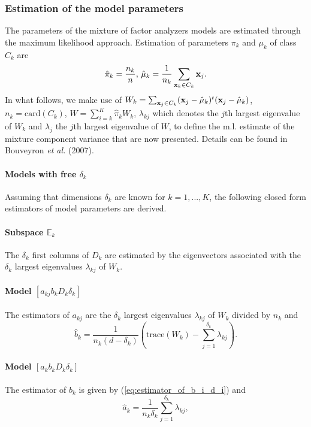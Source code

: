 \documentclass[12pt]{article}
\newcommand{\tr}{\mbox{trace}}
\begin{document}
\subsubsection{Estimation of the model parameters}
The parameters of the mixture of factor analyzers models are estimated through the maximum
likelihood approach.  Estimation of parameters $\pi_{k}$ and $\mu_{k}$ of class $C_{k}$ are
\[\hat{\pi}_{k}=\frac{n_{k}}{n},\,\hat{\mu}_{k}=\frac{1}{n_{k}}\sum_{{\bf x}_{k}\in C_{k}}{\bf x}_{j}.\]
In what follows, we make use of $W_k=\sum_{{\bf x}_{j}\in C_{k}}({\bf
  x}_{j}-\hat{\mu}_{k})^{t}({\bf x}_{j}-\hat{\mu}_{k})$, $n_{k}=\mbox{card}(C_{k})$,
$W=\sum_{i=k}^{K}\hat{\pi}_{k}W _{k}$, $\lambda_{kj}$ which denotes the $j$th largest
eigenvalue of $W_{k}$ and $\lambda_{j}$ the $j$th largest eigenvalue of $W$, to define the
m.l. estimate of the mixture component variance that are now presented.  Details can be found
in Bouveyron {\it et al.} (2007).

\paragraph{Models with free $\delta_k$}
Assuming that dimensions $\delta_{k}$ are known for $k=1,...,K$, the following closed form
estimators of model parameters are derived.

\paragraph{Subspace $\mathbb{E}_{k}$} The $\delta_{k}$ first columns
of $D_{k}$ are estimated by the eigenvectors associated with the
$\delta_{k}$ largest eigenvalues $\lambda_{kj}$ of $W_{k}$.

\paragraph{Model $[a_{kj}b_{k}D_{k}\delta_{k}]$}
The estimators of $a_{kj}$ are the $\delta_{k}$ largest eigenvalues $\lambda_{kj}$ of $W_{k}$
divided by $n_k$ and
\begin{equation}
  \hat{b}_{k}=\frac{1}{n_k(d-\delta_{k})}\left(\tr(W_{k})-\sum_{j=1}^{\delta_{k}}\lambda_{kj}\right).
  \label{eq:estimator_of_b_i_d_i}
\end{equation}

\paragraph{Model $[a_{k}b_{k}D_{k}\delta_{k}]$}
The estimator of $b_{k}$ is given by (\ref{eq:estimator_of_b_i_d_i}) and
\begin{equation}
  \hat{a}_{k}=\frac{1}{n_k\delta_{k}}\sum_{j=1}^{\delta_{k}}\lambda_{kj},
  \label{eq:estimator_of_a_i_di}
\end{equation}
\end{document}
